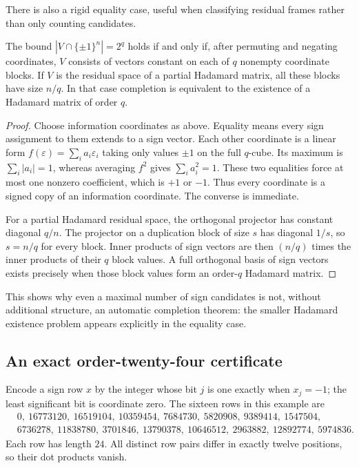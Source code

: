 There is also a rigid equality case, useful when classifying residual
frames rather than only counting candidates.
\begin{proposition}
The bound $|V\cap\{\pm1\}^n|=2^q$ holds if and only if, after
permuting and negating coordinates, $V$ consists of vectors constant
on each of $q$ nonempty coordinate blocks.
If $V$ is the residual space of a partial Hadamard matrix, all these
blocks have size $n/q$. In that case completion is equivalent to the
existence of a Hadamard matrix of order $q$.
\end{proposition}
\begin{proof}
Choose information coordinates as above. Equality means every sign
assignment to them extends to a sign vector. Each other coordinate is
a linear form $f(\varepsilon)=\sum_i a_i\varepsilon_i$ taking only
values $\pm1$ on the full $q$-cube. Its maximum is
$\sum_i|a_i|=1$, whereas averaging $f^2$ gives $\sum_i a_i^2=1$.
These two equalities force at most one nonzero coefficient, which is
$+1$ or $-1$. Thus every coordinate is a signed copy of an information
coordinate. The converse is immediate.

For a partial Hadamard residual space, the orthogonal projector has
constant diagonal $q/n$. The projector on a duplication block of size
$s$ has diagonal $1/s$, so $s=n/q$ for every block. Inner products of
sign vectors are then $(n/q)$ times the inner products of their $q$
block values. A full orthogonal basis of sign vectors exists precisely
when those block values form an order-$q$ Hadamard matrix.
\end{proof}

This shows why even a maximal number of sign candidates is not, without
additional structure, an automatic completion theorem: the smaller
Hadamard existence problem appears explicitly in the equality case.

\subsection{An exact order-twenty-four certificate}
Encode a sign row $x$ by the integer whose bit $j$ is one exactly when
$x_j=-1$; the least significant bit is coordinate zero. The sixteen
rows in this example are
\begin{align*}
 &0,\ 16773120,\ 16519104,\ 10359454,\ 7684730,\ 5820908,\ 9389414,\ 1547504,\\
 &6736278,\ 11838780,\ 3701846,\ 13790378,\ 10646512,\ 2963882,\ 12892774,\ 5974836.
\end{align*}
Each row has length $24$. All distinct row pairs differ in exactly
twelve positions, so their dot products vanish.


